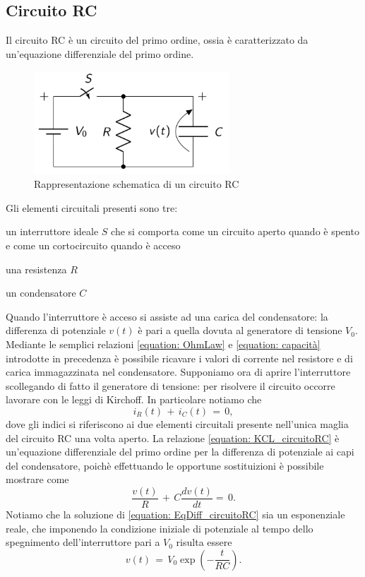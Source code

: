 \subsection{Circuito RC}

Il circuito RC è un circuito del primo ordine, ossia è caratterizzato da un'equazione differenziale del primo ordine. 
\begin{figure}[H]
    \centering
    \includegraphics[width=0.65\textwidth]{Immagini/CircuitoRC.png}
    \caption{Rappresentazione schematica di un circuito RC}
    \label{figure: CircuitoRC}
\end{figure}
Gli elementi circuitali presenti sono tre:
\begin{list}{\textbf{-}}{\setlength{\itemsep}{0cm}}
    \item un interruttore ideale $S$ che si comporta come un circuito aperto quando è spento e come un cortocircuito quando
    è acceso
    \item una resistenza $R$
    \item un condensatore $C$
\end{list}
Quando l'interruttore è acceso si assiste ad una carica del condensatore: la differenza di potenziale $v(t)$ è pari a quella
dovuta al generatore di tensione $V_0$. Mediante le semplici relazioni \eqref{equation: OhmLaw} e \eqref{equation: capacità}
introdotte in precedenza è possibile ricavare i valori di corrente nel resistore e di carica immagazzinata nel condensatore.
Supponiamo ora di aprire l'interruttore scollegando di fatto il generatore di tensione: per risolvere il circuito occorre
lavorare con le leggi di Kirchoff. In particolare notiamo che
\begin{equation}
    i_R\left(t\right)\,+\,i_C\left(t\right)\,=\,0,
    \label{equation: KCL_circuitoRC}
\end{equation}
dove gli indici si riferiscono ai due elementi circuitali presente nell'unica maglia del circuito RC una volta aperto.
La relazione \eqref{equation: KCL_circuitoRC} è un'equazione differenziale del primo ordine per la differenza di potenziale
ai capi del condensatore, poichè effettuando le opportune sostituizioni è possibile mostrare come 
\begin{equation}
    \frac{v\left(t\right)}{R}\,+\,C\frac{dv\left(t\right)}{dt}=\,0.
    \label{equation: EqDiff_circuitoRC}
\end{equation}
Notiamo che la soluzione di \eqref{equation: EqDiff_circuitoRC} sia un esponenziale reale, che imponendo la condizione iniziale
di potenziale al tempo dello spegnimento dell'interruttore pari a $V_0$ risulta essere
\begin{equation}
    v\left(t\right)\,=\,V_0\exp{\left(-\frac{t}{RC}\right)}.
    \label{equation: solEqDiff_circuitoRC}
\end{equation}


